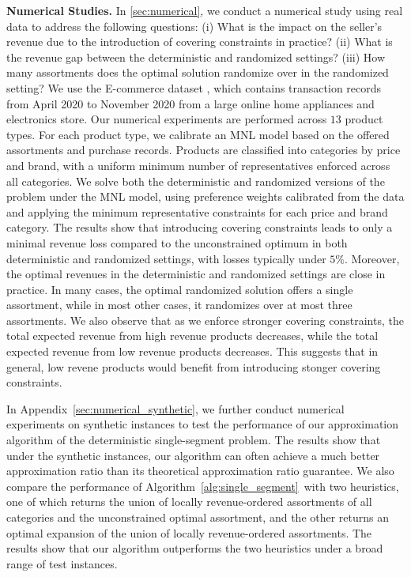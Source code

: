\documentclass[msom,non-blindrev]{informs3} %
\theoremstyle{definition}
\begin{document}
\noindent\textbf{Numerical Studies.} In \cref{sec:numerical}, we conduct a numerical study using real data to address the following questions: (i) What is the impact on the seller's revenue due to the introduction of covering constraints in practice? (ii) What is the revenue gap between the deterministic and randomized settings? (iii) How many assortments does the optimal solution randomize over in the randomized setting?
We use the E-commerce dataset \cite{ECommerceData}, which contains transaction records from April 2020 to November 2020 from a large online home appliances and electronics store. Our numerical experiments are performed across $13$ product types. For each product type, we calibrate an MNL model based on the offered assortments and purchase records. Products are classified into categories by price and brand, with a uniform minimum number of representatives enforced across all categories. 
We solve both the deterministic and randomized versions of the problem under the MNL model, using preference weights calibrated from the data and applying the minimum representative constraints for each price and brand category. The results show that introducing covering constraints leads to only a minimal revenue loss compared to the unconstrained optimum in both deterministic and randomized settings, with losses typically under $5\%$. Moreover, the optimal revenues in the deterministic and randomized settings are close in practice. In many cases, the optimal randomized solution offers a single assortment, while in most other cases, it randomizes over at most three assortments. {  We also observe that as we enforce stronger covering constraints, the total expected revenue from high revenue products decreases, while the total expected revenue from low revenue products decreases. This suggests that in general, low revene products would benefit from introducing stonger covering constraints.}

{  In Appendix~\ref{sec:numerical_synthetic}, we further conduct numerical experiments on synthetic instances to test the performance of our approximation algorithm of the deterministic single-segment problem. The results show that under the synthetic instances, our algorithm can often achieve a much better approximation ratio than its theoretical approximation ratio guarantee. We also compare the performance of Algorithm~\ref{alg:single_segment}~with two heuristics, one of which returns the union of locally revenue-ordered assortments of all categories and the unconstrained optimal assortment, and the other returns an optimal expansion of the union of locally revenue-ordered assortments. The results show that our algorithm outperforms the two heuristics under a broad range of test instances.}
\end{document}
